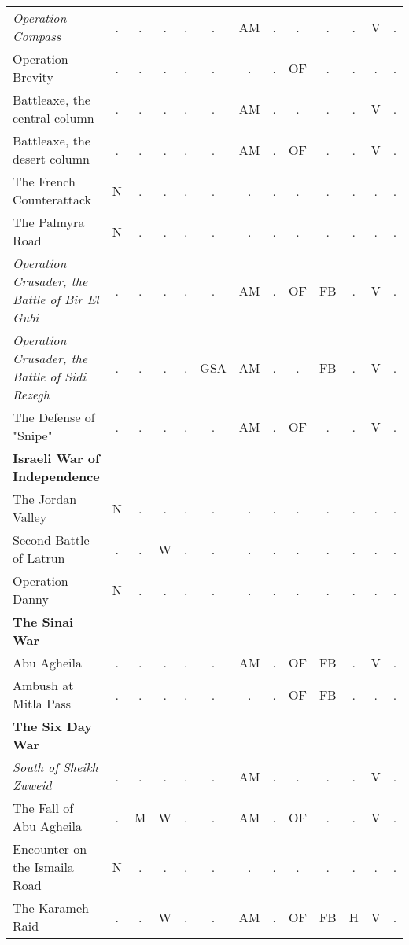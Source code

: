 \documentclass[a4paper]{article}
\newenvironment{texte}{\rmfamily\footnotesize}{}
\begin{document}
\begin{texte}
\begin{tabular}{lcccccccccccc}
\it  Operation Compass                             & . &  . &  . & .  &  .  & AM & . &  . &  . & . &  V & . \\
     Operation Brevity                             & . &  . &  . & .  &  .  & .  & . & OF &  . & . &  . & . \\
     Battleaxe, the central column                 & . &  . &  . & .  &  .  & AM & . &  . &  . & . &  V & . \\
     Battleaxe, the desert column                  & . &  . &  . & .  &  .  & AM & . & OF &  . & . &  V & . \\
     The French Counterattack                      & N &  . &  . & .  &  .  & .  & . &  . &  . & . &  . & . \\
     The Palmyra Road                              & N &  . &  . & .  &  .  & .  & . &  . &  . & . &  . & . \\
\it  Operation Crusader, the Battle of Bir El Gubi & . &  . &  . & .  &  .  & AM & . & OF & FB & . &  V & . \\
\it  Operation Crusader, the Battle of Sidi Rezegh & . &  . &  . & .  & GSA & AM & . &  . & FB & . &  V & . \\
     The Defense of "Snipe"                        & . &  . &  . & .  &  .  & AM & . & OF &  . & . &  V & . \\

\bf Israeli War of Independence \\

     The Jordan Valley                             & N &  . &  . &  . &  .  &  . & . &  . &  . & . &  . & . \\
     Second Battle of Latrun                       & . &  . &  W &  . &  .  &  . & . &  . &  . & . &  . & . \\
     Operation Danny                               & N &  . &  . &  . &  .  &  . & . &  . &  . & . &  . & . \\

\bf The Sinai War \\

     Abu Agheila                                   & . &  . &  . &  . &  .  & AM & . & OF & FB & . &  V & . \\
     Ambush at Mitla Pass                          & . &  . &  . &  . &  .  &  . & . & OF & FB & . &  . & . \\

\bf The Six Day War \\

\it  South of Sheikh Zuweid                        & . &  . &  . &  . &  .  & AM & . &  . &  . & . &  V & . \\
     The Fall of Abu Agheila                       & . &  M &  W &  . &  .  & AM & . & OF &  . & . &  V & . \\
     Encounter on the Ismaila Road                 & N &  . &  . &  . &  .  &  . & . &  . &  . & . &  . & . \\
     The Karameh Raid                              & . &  . &  W &  . &  .  & AM & . & OF & FB & H &  V & . \\


\end{tabular}
\end{texte}
\end{document}

